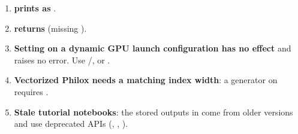 \begin{enumerate}
        \texttt{f[0,0]}~$\leftarrow$~\texttt{f[1,0]} is accepted (\cref{r01:sec:constraints}).
  \item \textbf{ prints as }.
  \item \textbf{ returns
        } (missing ).
  \item \textbf{Setting  on a dynamic GPU launch configuration has no
        effect} and raises no error. Use /, or
        .
  \item \textbf{Vectorized Philox needs a matching index width}: a 
        generator on  requires .
  \item \textbf{Stale tutorial notebooks}: the stored outputs in
         come from older versions and use
        deprecated APIs (, ,
        ).
\end{enumerate}

